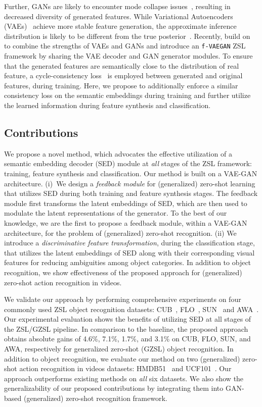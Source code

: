 \documentclass[runningheads]{llncs}
\newcommand{\vaegan}{\texttt{f-VAEGAN}}
\begin{document}
Further, GANs are likely to encounter mode collapse issues~\cite{arjovsky2017towards}, resulting in decreased diversity of generated features. While Variational Autoencoders (VAEs)~\cite{kingma13iclr} achieve more stable feature generation, the approximate inference distribution is likely to be different from the true posterior~\cite{zhao2019infovae}. Recently, \cite{Xian19cvpr} build on~\cite{Xian18cvpr} to combine the strengths of VAEs and GANs and introduce an \vaegan{} ZSL framework by sharing the VAE decoder and GAN generator modules. To ensure that the generated features are semantically close to the distribution of real feature, a cycle-consistency loss~\cite{CycleGAN} is employed between generated and original features, during training. Here, we propose to additionally enforce a similar consistency loss on the semantic embeddings during training and further utilize the learned information during feature synthesis and classification. 


\subsection{Contributions}
We propose a novel method, which advocates the effective utilization of a semantic embedding decoder (SED) module at \textit{all} stages of the ZSL framework: training, feature synthesis and classification. Our method is built on a VAE-GAN architecture. (i)~We design a \textit{feedback module} for (generalized) zero-shot learning that utilizes SED during both training and feature synthesis stages. The feedback module first transforms the latent embeddings of SED, which are then used to modulate the latent representations of the generator. To the best of our knowledge, we are the first to propose a feedback module, within a VAE-GAN architecture, for the problem of (generalized) zero-shot recognition. (ii) We introduce a \textit{discriminative feature transformation}, during the classification stage, that utilizes the latent embeddings of SED along with their corresponding visual features for reducing ambiguities among object categories. In addition to object recognition, we show effectiveness of the proposed approach for (generalized) zero-shot action recognition in videos. 



We validate our approach by performing comprehensive experiments on four commonly used ZSL object recognition datasets: CUB~\cite{cub}, FLO~\cite{flo}, SUN~\cite{sun} and AWA~\cite{zsl-good-bad-ugly}. Our experimental evaluation shows the benefits of utilizing SED at all stages of the ZSL/GZSL pipeline. In comparison to the baseline, the proposed approach obtains absolute gains of 4.6\%, 7.1\%, 1.7\%, and 3.1\% on CUB, FLO, SUN, and AWA, respectively for generalized zero-shot (GZSL) object recognition. In addition to object recognition, we evaluate our method on two (generalized) zero-shot action recognition in videos datasets: HMDB51~\cite{hmdb51} and UCF101~\cite{ucf101}. Our approach outperforms existing methods on \textit{all} six datasets. We also show the generalizability of our proposed contributions by integrating them into GAN-based (generalized) zero-shot recognition framework.
\end{document}
